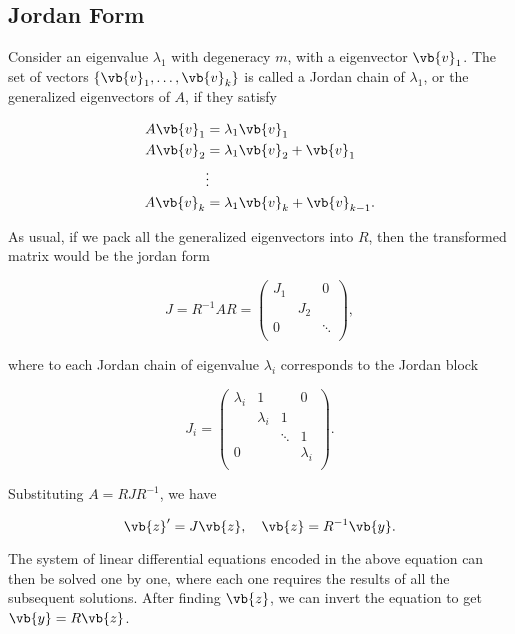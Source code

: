 \documentclass[english,a4paper,12pt]{report}
\begin{document}
\subsection{Jordan Form}

Consider an eigenvalue \(\lambda _{1} \) with degeneracy \(m\), with a eigenvector \(\vb{v} _{1} \). The set of vectors \(\left\{ \vb{v}_1, \ldots , \vb{v}_k \right\}\) is called a Jordan chain of \(\lambda _{1} \), or the generalized eigenvectors of \(A\), if they satisfy

\begin{equation}
    \begin{aligned}
        A\vb{v} _{1}&=\lambda _{1}\vb{v} _{1}\\
        A\vb{v} _{2}&=\lambda _{1}\vb{v} _{2}+\vb{v} _{1}\\
        &\vdots \\
        A\vb{v} _{k}&=\lambda _{1}\vb{v} _{k}+\vb{v} _{k-1}.           
    \end{aligned}
\end{equation}

As usual, if we pack all the generalized eigenvectors into \(R\), then the transformed matrix would be the jordan form

\begin{equation}
    J = R^{-1} AR = \begin{pmatrix}
        J_1  &  & 0  \\
         & J_2  &   \\
        0 &  &  \ddots \\
    \end{pmatrix},
\end{equation}

where to each Jordan chain of eigenvalue \(\lambda _{i} \) corresponds to the Jordan block 

\begin{equation}
    J_{i} = \begin{pmatrix}
        \lambda _{i}  & 1 &  & 0  \\
         & \lambda _{i}  & 1 &   \\
         &  & \ddots & 1  \\
        0 &  &  & \lambda _{i}  \\
    \end{pmatrix}.
\end{equation}

Substituting \(A = RJR^{-1} \), we have

\begin{equation}
    \vb{z} ' = J\vb{z} , \quad \vb{z} = R^{-1} \vb{y}.
\end{equation}

The system of linear differential equations encoded in the above equation can then be solved one by one, where each one requires the results of all the subsequent solutions. After finding \(\vb{z}\), we can invert the equation to get \(\vb{y}  = R\vb{z} \).  
\end{document}
